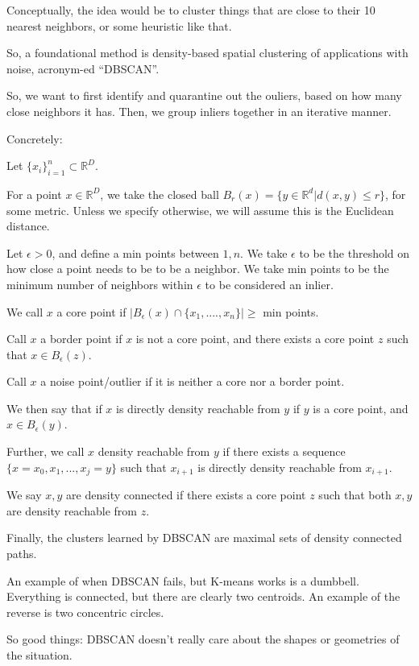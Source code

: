\documentclass[10pt]{article}
\begin{document}
Conceptually, the idea would be to cluster things that are close to their 10 nearest neighbors, or some heuristic like that.

So, a foundational method is density-based spatial clustering of applications with noise, acronym-ed “DBSCAN”.

So, we want to first identify and quarantine out the ouliers, based on how many close neighbors it has. Then, we group inliers together in an iterative manner.

Concretely:

Let $\{ x_i \}_{i=1}^n \subset \mathbb{R}^D$. 

For a point $x \in \mathbb{R}^D$, we take the closed ball $B_r(x) = \{ y \in \mathbb{R}^d | d(x,y) \leq r \}$, for some metric. Unless we specify otherwise, we will assume this is the Euclidean distance.

Let $\epsilon > 0$, and define a min points between $1, n$. We take $\epsilon$ to be the threshold on how close a point needs to be to be a neighbor. We take min points to be the minimum number of neighbors within $\epsilon$ to be considered an inlier.

We call $x$ a core point if $| B_\epsilon(x) \cap \{ x_1,....,x_n \} | \geq$ min points. 

Call $x$ a border point if $x$ is not a core point, and there exists a core point $z$ such that $x \in B_\epsilon(z)$.

Call $x$ a noise point/outlier if it is neither a core nor a border point.

We then say that if $x$ is directly density reachable from $y$ if $y$ is a core point, and $x \in B_\epsilon(y)$.

Further, we call $x$ density reachable from $y$ if there exists a sequence $\{ x = x_0, x_1, ..., x_j = y \}$ such that $x_{i+1}$ is directly density reachable from $x_{i+1}$.

We say $x,y$ are density connected if there exists a core point $z$ such that both $x,y$ are density reachable from $z$. 

Finally, the clusters learned by DBSCAN are maximal sets of density connected paths.

An example of when DBSCAN fails, but K-means works is a dumbbell. Everything is connected, but there are clearly two centroids. An example of the reverse is two concentric circles.

So good things: DBSCAN doesn’t really care about the shapes or geometries of the situation.
\end{document}
